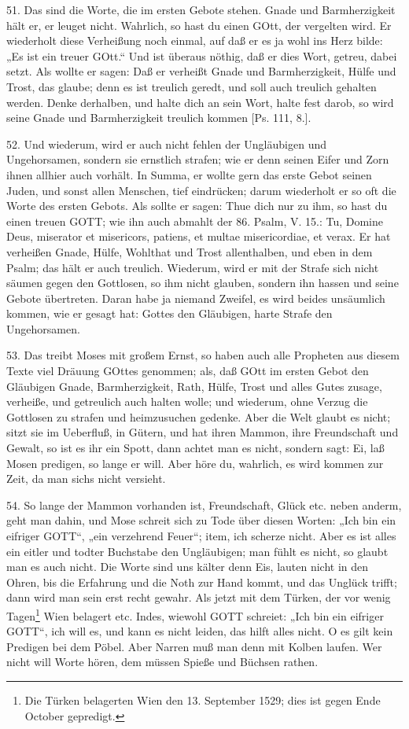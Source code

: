 51. Das sind die Worte, die im ersten Gebote stehen. Gnade und Barmherzigkeit hält er, er leuget nicht. Wahrlich, so hast du einen GOtt, der vergelten wird. Er wiederholt diese Verheißung noch einmal, auf daß er es ja wohl ins Herz bilde: „Es ist ein treuer GOtt.“ Und ist überaus nöthig, daß er dies Wort, getreu, dabei setzt. Als wollte er sagen: Daß er verheißt Gnade und Barmherzigkeit, Hülfe und Trost, das glaube; denn es ist treulich geredt,
und soll auch treulich gehalten werden. Denke derhalben, und halte dich an sein Wort, halte fest darob, so wird seine Gnade und Barmherzigkeit treulich kommen [Ps. 111, 8.].

52. Und wiederum, wird er auch nicht fehlen der Ungläubigen und Ungehorsamen, sondern sie ernstlich strafen; wie er denn seinen Eifer und Zorn ihnen allhier auch vorhält. In Summa, er wollte gern das erste Gebot seinen Juden, und sonst allen Menschen, tief eindrücken; darum wiederholt er so oft die Worte des ersten Gebots. Als sollte er sagen: Thue dich nur zu ihm, so hast du einen treuen GOTT; wie ihn auch abmahlt der 86. Psalm, V. 15.: Tu, Domine Deus, miserator et misericors, patiens, et multae misericordiae, et verax. Er hat verheißen Gnade, Hülfe, Wohlthat und Trost allenthalben, und eben in dem Psalm; das hält er auch treulich. Wiederum, wird er mit der Strafe sich nicht säumen gegen den Gottlosen, so ihm nicht glauben, sondern ihn hassen und seine Gebote übertreten. Daran habe ja niemand Zweifel, es wird beides unsäumlich kommen, wie er gesagt hat: Gottes den Gläubigen, harte Strafe den Ungehorsamen.

53. Das treibt Moses mit großem Ernst, so haben auch alle Propheten aus diesem Texte viel Dräuung GOttes genommen; als, daß GOtt im ersten Gebot den Gläubigen Gnade, Barmherzigkeit, Rath, Hülfe, Trost und alles Gutes zusage, verheiße, und getreulich auch halten wolle; und wiederum, ohne Verzug die Gottlosen zu strafen und heimzusuchen gedenke. Aber die Welt glaubt es nicht; sitzt sie im Ueberfluß, in Gütern, und hat ihren Mammon, ihre Freundschaft und Gewalt, so ist es ihr ein Spott, dann achtet man es nicht, sondern sagt: Ei, laß Mosen predigen, so lange er will. Aber höre du, wahrlich, es wird kommen zur Zeit, da man sichs nicht versieht.

54. So lange der Mammon vorhanden ist, Freundschaft, Glück etc. neben anderm, geht man dahin, und Mose schreit sich zu Tode über diesen Worten: „Ich bin ein eifriger GOTT“, „ein verzehrend Feuer“; item, ich scherze nicht. Aber es ist alles ein eitler und todter Buchstabe den Ungläubigen; man fühlt es nicht, so glaubt man es auch nicht. Die Worte sind uns kälter denn Eis, lauten nicht in den Ohren, bis die Erfahrung und die Noth zur Hand kommt, und das Unglück trifft; dann wird man sein erst recht gewahr. Als jetzt mit dem Türken, der vor wenig Tagen\footnote{Die Türken belagerten Wien den 13. September 1529; dies ist gegen Ende October gepredigt.} Wien belagert etc. Indes, wiewohl GOTT schreiet: „Ich bin ein eifriger GOTT“, ich will es, und kann es nicht leiden, das hilft alles nicht. O es gilt kein Predigen bei dem Pöbel. Aber Narren muß man denn mit Kolben laufen. Wer nicht will Worte hören, dem müssen Spieße und Büchsen rathen.

